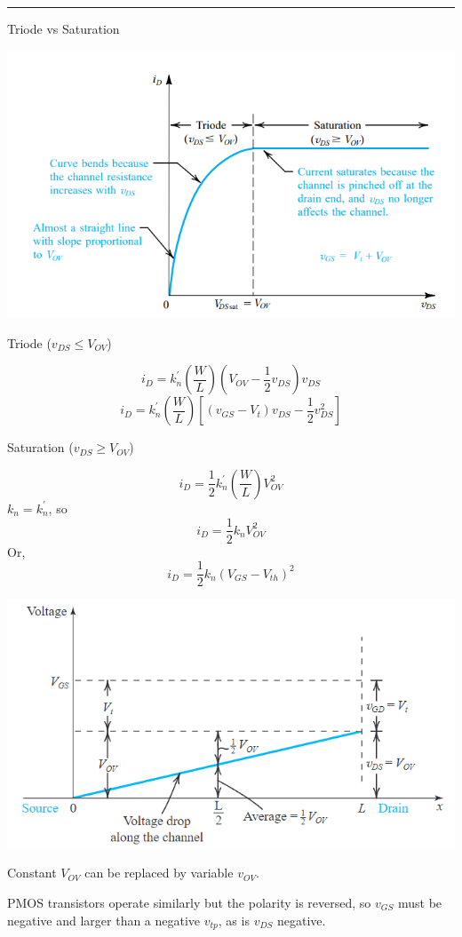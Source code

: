 \documentclass[a4paper]{article}
\begin{document}
\begin{multicols}{3}
\hrule
\vspace{1mm}
Triode vs Saturation

\includegraphics[width=\linewidth]{imgs/triode_sat.png}

Triode ($v_{DS} \leq V_{OV}$)

$$i_D=k_n^{'}\left(\frac{W}{L}\right)\left(V_{OV}-\frac{1}{2}v_{DS}\right)v_{DS}$$
$$i_D=k_n^{'}\left(\frac{W}{L}\right)\left[(v_{GS}-V_t)v_{DS}-\frac{1}{2}v_{DS}^2\right]$$

Saturation ($v_{DS} \geq V_{OV}$)

$$i_D=\frac{1}{2}k_n^{'}\left(\frac{W}{L}\right)V_{OV}^2$$
$k_n=k_n^{'}$, so
$$i_D=\frac{1}{2}k_nV_{OV}^2$$
Or,
$$i_D=\frac{1}{2}k_n(V_{GS}-V_{th})^2$$

\includegraphics[width=\linewidth]{imgs/mosfet_sat.png}

Constant $V_{OV}$ can be replaced by variable $v_{OV}$.

PMOS transistors operate similarly but the polarity is
reversed, so $v_{GS}$ must be negative and larger than 
a negative $v_{tp}$, as is $v_{DS}$ negative.


\end{multicols}
\end{document}
